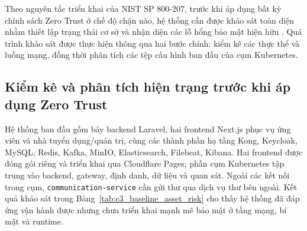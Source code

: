 Theo nguyên tắc triển khai của NIST SP 800-207, trước khi áp dụng bất kỳ chính sách Zero Trust ở chế độ chặn nào, hệ thống cần được khảo sát toàn diện nhằm thiết lập trạng thái cơ sở và nhận diện các lỗ hổng bảo mật hiện hữu \parencite{nist800207}. Quá trình khảo sát được thực hiện thông qua hai bước chính: kiểm kê các thực thể và luồng mạng, đồng thời phân tích các tệp cấu hình ban đầu của cụm Kubernetes.

\subsection{Kiểm kê và phân tích hiện trạng trước khi áp dụng Zero Trust}

Hệ thống ban đầu gồm bảy backend Laravel, hai frontend Next.js phục vụ ứng viên và nhà tuyển dụng/quản trị, cùng các thành phần hạ tầng Kong, Keycloak, MySQL, Redis, Kafka, MinIO, Elasticsearch, Filebeat, Kibana. Hai frontend được đóng gói riêng và triển khai qua Cloudflare Pages; phần cụm Kubernetes tập trung vào backend, gateway, định danh, dữ liệu và quan sát. Ngoài các kết nối trong cụm, \texttt{communication-service} cần gửi thư qua dịch vụ thư bên ngoài. Kết quả khảo sát trong Bảng~\ref{tab:c3_baseline_asset_risk} cho thấy hệ thống đã đáp ứng vận hành được nhưng chưa triển khai mạnh mẽ bảo mật ở tầng mạng, bí mật và runtime.

